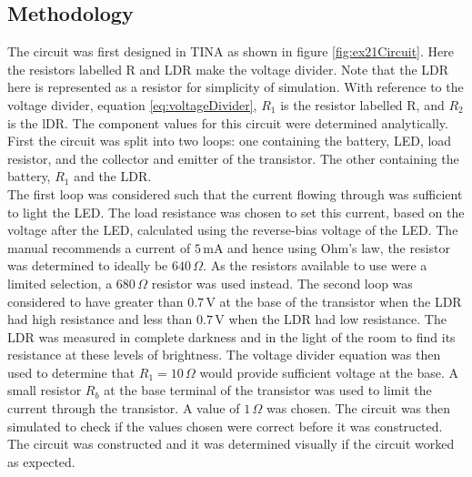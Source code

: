 \documentclass[%
reprint,
amsmath,amssymb,
aps,
floatfix
]{revtex4-2}
\begin{document}
		\subsection{Methodology}
		The circuit was first designed in TINA as shown in figure \ref{fig:ex21Circuit}. Here the resistors labelled R and LDR make the voltage divider. Note that the LDR here is represented as a resistor for simplicity of simulation. With reference to the voltage divider, equation \ref{eq:voltageDivider}, $R_1$ is the resistor labelled R, and $R_2$ is the lDR. The component values for this circuit were determined analytically. First the circuit was split into two loops: one containing the battery, LED, load resistor, and the collector and emitter of the transistor. The other containing the battery, $R_1$ and the LDR.\\
		
		The first loop was considered such that the current flowing through was sufficient to light the LED. The load resistance was chosen to set this current, based on the voltage after the LED, calculated using the reverse-bias voltage of the LED. The manual recommends a current of $5 \,\text{mA}$ and hence using Ohm's law, the resistor was determined to ideally be $640\,\Omega$. As the resistors available to use were a limited selection, a $680 \,\Omega$ resistor was used instead. The second loop was considered to have greater than $0.7\,\text{V}$ at the base of the transistor when the LDR had high resistance and less than $0.7\,\text{V}$ when the LDR had low resistance. The LDR was measured in complete darkness and in the light of the room to find its resistance at these levels of brightness. The voltage divider equation was then used to determine that $R_1 = 10\,\Omega$ would provide sufficient voltage at the base. A small resistor $R_b$ at the base terminal of the transistor was used to limit the current through the transistor. A value of $1\,\Omega$ was chosen. The circuit was then simulated to check if the values chosen were correct before it was constructed. The circuit was constructed and it was determined visually if the circuit worked as expected.
		
\end{document}
